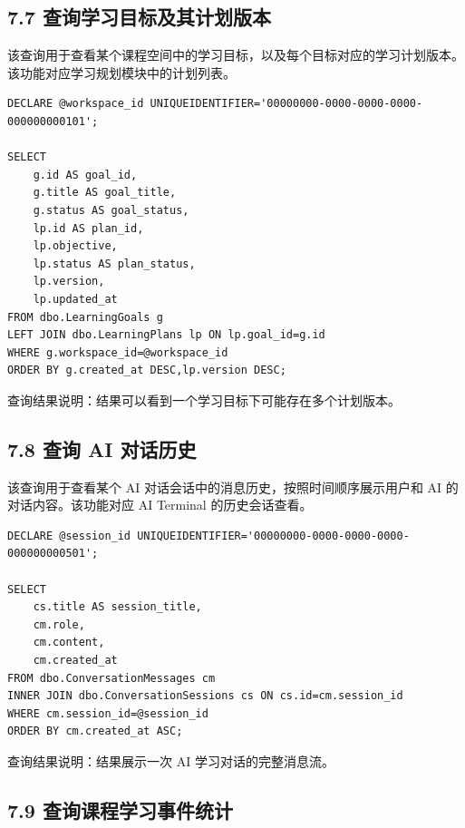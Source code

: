 \documentclass[10pt,a4paper,fontset=none]{ctexart}
\begin{document}
\subsection*{7.7 查询学习目标及其计划版本}

该查询用于查看某个课程空间中的学习目标，以及每个目标对应的学习计划版本。该功能对应学习规划模块中的计划列表。\par

\begin{Verbatim}[fontsize=\scriptsize,frame=single]
DECLARE @workspace_id UNIQUEIDENTIFIER='00000000-0000-0000-0000-000000000101';

SELECT
    g.id AS goal_id,
    g.title AS goal_title,
    g.status AS goal_status,
    lp.id AS plan_id,
    lp.objective,
    lp.status AS plan_status,
    lp.version,
    lp.updated_at
FROM dbo.LearningGoals g
LEFT JOIN dbo.LearningPlans lp ON lp.goal_id=g.id
WHERE g.workspace_id=@workspace_id
ORDER BY g.created_at DESC,lp.version DESC;
\end{Verbatim}

查询结果说明：结果可以看到一个学习目标下可能存在多个计划版本。\par

\subsection*{7.8 查询 AI 对话历史}

该查询用于查看某个 AI 对话会话中的消息历史，按照时间顺序展示用户和 AI 的对话内容。该功能对应 AI Terminal 的历史会话查看。\par

\begin{Verbatim}[fontsize=\scriptsize,frame=single]
DECLARE @session_id UNIQUEIDENTIFIER='00000000-0000-0000-0000-000000000501';

SELECT
    cs.title AS session_title,
    cm.role,
    cm.content,
    cm.created_at
FROM dbo.ConversationMessages cm
INNER JOIN dbo.ConversationSessions cs ON cs.id=cm.session_id
WHERE cm.session_id=@session_id
ORDER BY cm.created_at ASC;
\end{Verbatim}

查询结果说明：结果展示一次 AI 学习对话的完整消息流。\par

\subsection*{7.9 查询课程学习事件统计}
\end{document}
